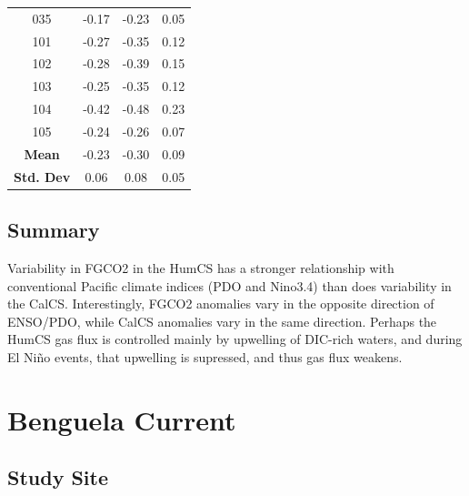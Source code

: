 \documentclass[12pt]{article}
\begin{document}
\begin{table}[p!]
\begin{tabular}{c | c c c}
		035 &  -0.17 &    -0.23 &       0.05 \\
		101 &  -0.27 &    -0.35 &       0.12 \\
		102 &  -0.28 &    -0.39 &       0.15 \\
		103 &  -0.25 &    -0.35 &       0.12 \\
		104 &  -0.42 &    -0.48 &       0.23 \\
		105 &  -0.24 &    -0.26 &       0.07 \\
		\bottomrule
		\textbf{Mean} & -0.23 & -0.30 & 0.09 \\
		\textbf{Std. Dev} & 0.06 & 0.08 & 0.05 \\
	\end{tabular}
	\label{tab:4}
\end{table}

\clearpage
\subsection{Summary}
Variability in FGCO2 in the HumCS has a stronger relationship with conventional Pacific climate indices (PDO and Nino3.4) than does variability in the CalCS. Interestingly, FGCO2 anomalies vary in the opposite direction of ENSO/PDO, while CalCS anomalies vary in the same direction. Perhaps the HumCS gas flux is controlled mainly by upwelling of DIC-rich waters, and during El Ni\~no events, that upwelling is supressed, and thus gas flux weakens. 

\section{Benguela Current}
\subsection{Study Site}
\end{document}
